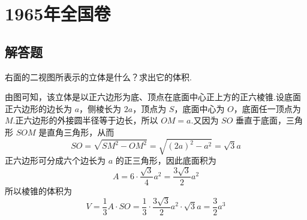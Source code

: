 
\chapter{1965年全国卷}

\section{解答题}

\begin{problem}
右面的二视图所表示的立体是什么？求出它的体积.

\end{problem}

\begin{solution}
由图可知，该立体是以正六边形为底、顶点在底面中心正上方的正六棱锥.设底面正六边形的边长为 \(a\)，侧棱长为 \(2a\)，顶点为 \(S\)，底面中心为 \(O\)，底面任一顶点为 \(M\).正六边形的外接圆半径等于边长，所以 \(OM=a\).又因为 \(SO\) 垂直于底面，三角形 \(SOM\) 是直角三角形，从而
\[
SO=\sqrt{SM^2-OM^2}=\sqrt{(2a)^2-a^2}=\sqrt{3}a
\]
正六边形可分成六个边长为 \(a\) 的正三角形，因此底面积为
\[
A=6\cdot\frac{\sqrt{3}}{4}a^2=\frac{3\sqrt{3}}{2}a^2
\]
所以棱锥的体积为
\[
V=\frac{1}{3}A\cdot SO=\frac{1}{3}\cdot\frac{3\sqrt{3}}{2}a^2\cdot\sqrt{3}a=\frac{3}{2}a^3
\]
\end{solution}

